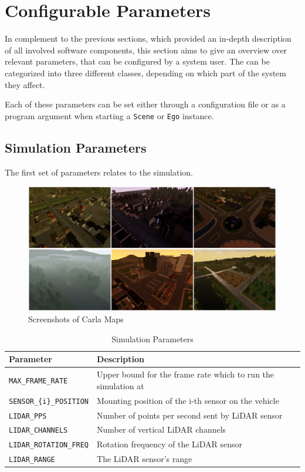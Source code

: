 \section{Configurable Parameters}
\label{sec:implementation:configurable_parameters}
In complement to the previous sections, which provided an in-depth description of all involved software components, this section aims to give an overview over relevant parameters, that can be configured by a system user. The can be categorized into three different classes, depending on which part of the system they affect.

Each of these parameters can be set either through a configuration file or as a program argument when starting a \texttt{Scene} or \texttt{Ego} instance.

\subsection{Simulation Parameters}
\label{subsec:implementation:simulation_parameters}
The first set of parameters relates to the simulation.

\begin{figure}
	\centering
	\includegraphics[width=1.0\linewidth]{98_images/carla_collage}
	\caption{Screenshots of Carla Maps}
	\label{fig:carla_collage}
\end{figure}


\begin{table}[H]
	\centering
	\begin{tabular}{|p{7.6cm}|p{7.6cm}|}
		\hline
		\textbf{Parameter} & \textbf{Description} \\ \hline
		\texttt{MAX\_FRAME\_RATE} & Upper bound for the frame rate which to run the simulation at \\ \hline
		\texttt{SENSOR\_\{i\}\_POSITION} & Mounting position of the i-th sensor on the vehicle \\ \hline
		\texttt{LIDAR\_PPS} & Number of points per second sent by LiDAR sensor \\ \hline
		\texttt{LIDAR\_CHANNELS} & Number of vertical LiDAR channels \\ \hline
		\texttt{LIDAR\_ROTATION\_FREQ} & Rotation frequency of the LiDAR sensor \\ \hline
		\texttt{LIDAR\_RANGE} & The LiDAR sensor's range \\ \hline
	\end{tabular}
	\caption{Simulation Parameters}
	\label{tab:simulation_parameters}
\end{table}


